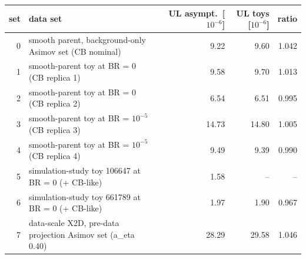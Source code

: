\begin{tabular}{rlrrr}
\toprule
set & data set & UL asympt.\ [$10^{-6}$] & UL toys [$10^{-6}$] & ratio \\
\midrule
0 & smooth parent, background-only Asimov set (CB nominal) & 9.22 & 9.60 & 1.042 \\
1 & smooth-parent toy at BR = 0 (CB replica 1) & 9.58 & 9.70 & 1.013 \\
2 & smooth-parent toy at BR = 0 (CB replica 2) & 6.54 & 6.51 & 0.995 \\
3 & smooth-parent toy at BR = $10^{-5}$ (CB replica 3) & 14.73 & 14.80 & 1.005 \\
4 & smooth-parent toy at BR = $10^{-5}$ (CB replica 4) & 9.49 & 9.39 & 0.990 \\
5 & simulation-study toy 106647 at BR = 0 (+ CB-like) & 1.58 & -- & -- \\
6 & simulation-study toy 661789 at BR = 0 (+ CB-like) & 1.97 & 1.90 & 0.967 \\
7 & data-scale X2D, pre-data projection Asimov set (a\_eta 0.40) & 28.29 & 29.58 & 1.046 \\
\bottomrule
\end{tabular}
